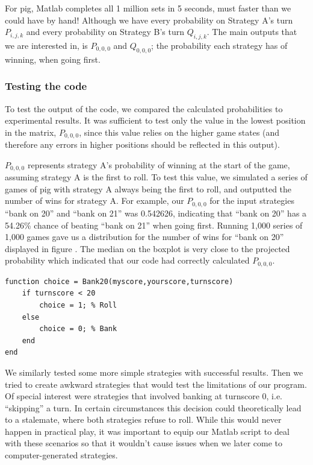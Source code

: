 \documentclass[a4paper,titlepage]{article}
\begin{document}
For pig, Matlab completes all 1 million sets in 5 seconds, must faster than we could have by hand! Although we have every probability on Strategy A's turn $P_{i,j,k}$ and every probability on Strategy B's turn $Q_{i,j,k}$. The main outputs that we are interested in, is $P_{0,0,0}$ and $Q_{0,0,0}$; the probability each strategy has of winning, when going first.

\subsubsection{Testing the code}


To test the output of the code, we compared the calculated probabilities to experimental results. It was sufficient to test only the value in the lowest position in the matrix, $P_{0,0,0}$, since this value relies on the higher game states (and therefore any errors in higher positions should be reflected in this output).

$P_{0,0,0}$ represents strategy A's probability of winning at the start of the game, assuming strategy A is the first to roll. To test this value, we simulated a series of games of pig with strategy A always being the first to roll, and outputted the number of wins for strategy A. For example, our $P_{0,0,0}$ for the input strategies ``bank on 20'' and ``bank on 21'' was 0.542626, indicating that ``bank on 20'' has a 54.26\% chance of beating ``bank on 21'' when going first. Running 1,000 series of 1,000 games gave us a distribution for the number of wins for ``bank on 20'' displayed in figure %
. The median on the boxplot is very close to the projected probability which indicated that our code had correctly calculated $P_{0,0,0}$.

\begin{lstlisting}
function choice = Bank20(myscore,yourscore,turnscore)
	if turnscore < 20
		choice = 1; % Roll
	else
		choice = 0; % Bank
	end
end
\end{lstlisting}

We similarly tested some more simple strategies with successful results. Then we tried to create awkward strategies that would test the limitations of our program. Of special interest were strategies that involved banking at turnscore 0, i.e. ``skipping'' a turn. In certain circumstances this decision could theoretically lead to a stalemate, where both strategies refuse to roll. While this would never happen in practical play, it was important to equip our Matlab script to deal with these scenarios so that it wouldn't cause issues when we later come to computer-generated strategies.
\end{document}

